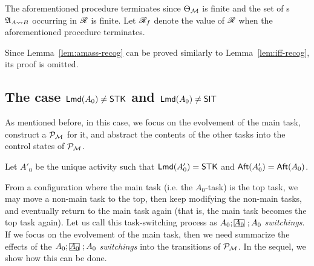 \medskip

The aforementioned procedure terminates since $\Theta_{\mathcal{M} }$ is finite and the set of {\NFA}s ${\mathfrak{A} }_{A\rightsquigarrow B}$ occurring in $\mathscr{R}$ is finite.
Let $\mathscr{R}_f$ denote the value of $\mathscr{R}$ when the aforementioned procedure terminates. 

Since Lemma~\ref{lem:amass-recog} can be proved similarly to Lemma~\ref{lem:iff-recog}, its proof is omitted. 

\subsection{The case ${\sf Lmd}(A_0) \neq \mathsf{STK}$ and ${\sf Lmd}(A_0) \neq \mathsf{SIT}$}\label{sec:amass-nostk}

As mentioned before, in this case, we focus on the evolvement of the main task, construct a {\WOTrPDS} ${\mathcal{P} }_{{\mathcal{M} }}$ for it, and abstract the contents of the other tasks into the control states of ${\mathcal{P} }_{{\mathcal{M} }}$. 

Let $A'_0$ be the unique activity such that ${\sf Lmd}(A'_0) = {\sf STK}$ and ${\sf Aft}(A'_0) = {\sf Aft}(A_0)$.  

From a configuration where the main task (i.e. the $A_0$-task) is the top task, we may move a non-main task to the top, then keep modifying the non-main tasks, and eventually return to the main task again (that is, the main task becomes the top task again). Let us call this task-switching process as $A_0;\mhcancel{A_0};A_0$ \emph{switchings}. If we focus on the evolvement of the main task, then we need summarize the effects of the $A_0;\mhcancel{A_0};A_0$ \emph{switchings} into the transitions of ${\mathcal{P} }_{{\mathcal{M} }}$.
In the sequel, we show how this can be done. 

